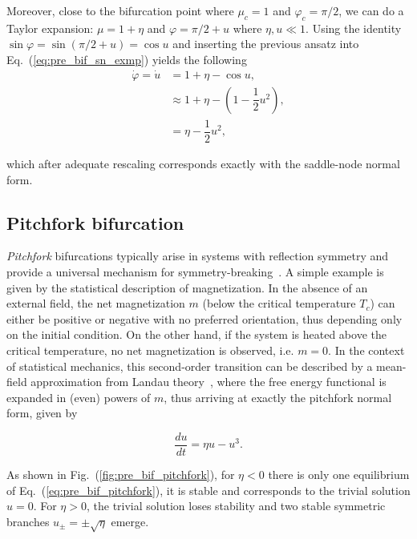 \begin{exmp}
    Moreover, close to the bifurcation point where $\mu_c = 1$ and $\varphi_c = \pi/2$,
    we can do a Taylor expansion: $\mu = 1 + \eta$ and $\varphi = \pi/2 + u$ 
    where $\eta, u \ll 1$. Using the identity $\sin \varphi = \sin (\pi/2 + u) = \cos u$
    and inserting the previous ansatz into Eq.~(\ref{eq:pre_bif_sn_exmp}) yields
    the following
    \begin{align*}
        \dot{\varphi} = \dot{u} &= 1 + \eta - \cos u, \\ 
        &\approx 1 + \eta - (1 - \dfrac12 u^2), \\
        &= \eta - \dfrac12 u^2,
    \end{align*}

    \noindent which after adequate rescaling corresponds exactly with the saddle-node
    normal form.
    

\end{exmp}

\subsection{Pitchfork bifurcation}

{\em Pitchfork} bifurcations typically arise in systems with reflection symmetry and 
provide a universal mechanism for symmetry-breaking~\cite{strogatz2018nonlinear}. 
A simple example is given by the statistical description of magnetization. 
In the absence of an external field, the net magnetization $m$ 
(below the critical temperature $T_c$) can either be positive or negative 
with no preferred orientation, thus depending only on the initial condition. On the
other hand, if the system is heated above the critical temperature, no net magnetization
is observed, i.e. $m=0$. In the context of statistical mechanics, this second-order
transition can be described by a mean-field approximation from Landau 
theory~\cite{landau2013statistical,kardar2007statistical}, where
the free energy functional is expanded in (even) powers of $m$, thus arriving at exactly
the pitchfork normal form, given by

\begin{equation}
    \dfrac{du}{dt} = \eta u - u ^ 3.
    \label{eq:pre_bif_pitchfork}
\end{equation}

As shown in Fig.~(\ref{fig:pre_bif_pitchfork}), for $\eta < 0$ there is only one 
equilibrium of Eq.~(\ref{eq:pre_bif_pitchfork}), it is stable and corresponds
to the trivial solution $u=0$. For $\eta > 0$, the trivial solution loses stability
and two stable symmetric branches $u_\pm = \pm \sqrt{\eta}$ emerge. 

